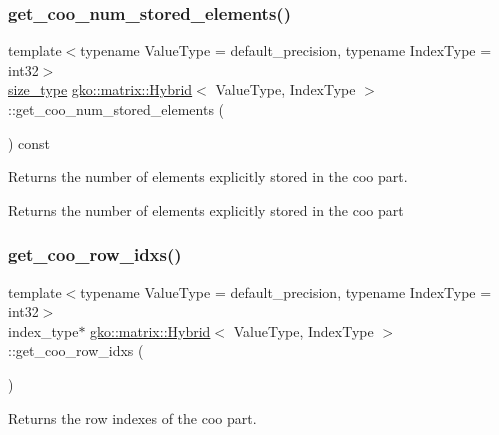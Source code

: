 \subsubsection{\texorpdfstring{get\+\_\+coo\+\_\+num\+\_\+stored\+\_\+elements()}{get\_coo\_num\_stored\_elements()}}
{\footnotesize\ttfamily template$<$typename Value\+Type = default\+\_\+precision, typename Index\+Type = int32$>$ \\
\hyperlink{namespacegko_a6e5c95df0ae4e47aab2f604a22d98ee7}{size\+\_\+type} \hyperlink{classgko_1_1matrix_1_1Hybrid}{gko\+::matrix\+::\+Hybrid}$<$ Value\+Type, Index\+Type $>$\+::get\+\_\+coo\+\_\+num\+\_\+stored\+\_\+elements (\begin{DoxyParamCaption}{ }\end{DoxyParamCaption}) const\hspace{0.3cm}{\ttfamily [noexcept]}}



Returns the number of elements explicitly stored in the coo part. 

\begin{DoxyReturn}{Returns}
the number of elements explicitly stored in the coo part 
\end{DoxyReturn}
\mbox{\label{classgko_1_1matrix_1_1Hybrid_aa64e1442587df4be9bc55f38d91be26d}} 
\subsubsection{\texorpdfstring{get\+\_\+coo\+\_\+row\+\_\+idxs()}{get\_coo\_row\_idxs()}}
{\footnotesize\ttfamily template$<$typename Value\+Type = default\+\_\+precision, typename Index\+Type = int32$>$ \\
index\+\_\+type$\ast$ \hyperlink{classgko_1_1matrix_1_1Hybrid}{gko\+::matrix\+::\+Hybrid}$<$ Value\+Type, Index\+Type $>$\+::get\+\_\+coo\+\_\+row\+\_\+idxs (\begin{DoxyParamCaption}{ }\end{DoxyParamCaption})\hspace{0.3cm}{\ttfamily [noexcept]}}



Returns the row indexes of the coo part. 

